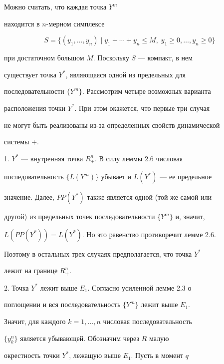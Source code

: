 \begin{pf} Можно считать, что каждая точка $Y^m$ 


находится в $n$-мерном симплексе


$$


S=\{


(y_1,\dotsc,y_n)\mid y_1+\dotsb+y_n\leqslant M,\; y_1\geqslant0,\dotsc, 


y_n\geqslant 0\}


$$


при достаточном большом $M$. Поскольку $S$ --- компакт, в нем 


существует точка $Y^*$, являющаяся одной из предельных для 


последовательности $\{Y^m\}$. Рассмотрим четыре возможных варианта 


расположения точки $Y^*$. При этом окажется, что первые три случая 


не могут быть реализованы из-за определенных свойств динамической 


системы $+$.


\medskip





1. $Y^*$ --- внутренняя точка $R_+^n$. В силу леммы 2.6 числовая 


последовательность $\{L(Y^m)\}$ убывает и $L(Y^*)$ --- ее предельное 


значение. Далее, $PP(Y^*)$ также является одной (той же самой или 


другой) из предельных точек последовательности $\{Y^m\}$ и, значит, 


$L(PP(Y^*))=L(Y^*)$. Но это равенство противоречит лемме 2.6. 


Поэтому в остальных трех случаях предполагается, что точка $Y^*$ 


лежит на границе $R_+^n$.


\medskip





2. Точка $Y^*$ лежит выше $E_1$. Согласно усиленной лемме 2.3 о 


поглощении и вся последовательность $\{Y^m\}$ лежит выше $E_1$. 


Значит, для каждого $k=1,\dotsc,n$ числовая последовательность 


$\{y_k^n\}$ является убывающей. Обозначим через $R$ малую 


окрестность точки $Y^*$, лежащую выше $E_1$. Пусть в момент $q$ 



\end{pf}
